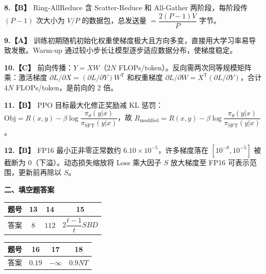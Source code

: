 \documentclass[a4paper]{ctexart}
\newcommand{\bodyfont}{\fontsize{12pt}{16pt}\selectfont}
\begin{document}
\noindent\textbf{8.【B】} Ring-AllReduce 含 Scatter-Reduce 和 All-Gather 两阶段，每阶段传 $(P-1)$ 次大小为 $V/P$ 的数据包，总发送量 $=\dfrac{2(P-1)V}{P}$ 字节。

\vspace{0.5em}

\noindent\textbf{9.【A】} 训练初期随机初始化权重使梯度极大且方向多变，直接用大学习率易导致发散。Warm-up 通过较小步长让模型逐步适应数据分布，使梯度稳定。

\vspace{0.5em}

\noindent\textbf{10.【C】} 前向传播：$Y=XW$（$2N$ FLOPs/token）。反向需两次同等规模矩阵乘：激活梯度 $\partial L/\partial X=(\partial L/\partial Y)W^{\mathsf{T}}$ 和权重梯度 $\partial L/\partial W=X^{\mathsf{T}}(\partial L/\partial Y)$，合计 $4N$ FLOPs/token，是前向的 2 倍。

\vspace{0.5em}

\noindent\textbf{11.【B】} PPO 目标最大化修正奖励减 KL 惩罚：$\mathrm{Obj}=R(x,y)-\beta\log\dfrac{\pi_\theta(y|x)}{\pi_{\mathrm{SFT}}(y|x)}$，故 $R_{\mathrm{modified}}=R(x,y)-\beta\log\dfrac{\pi_\theta(y|x)}{\pi_{\mathrm{SFT}}(y|x)}$。

\vspace{0.5em}

\noindent\textbf{12.【B】} FP16 最小正非零正常数约 $6.10\times10^{-5}$，许多梯度落在 $[10^{-8},10^{-5}]$ 被截断为 0（下溢）。动态损失缩放将 Loss 乘大因子 $S$ 放大梯度至 FP16 可表示范围，更新前再除以 $S$。

\vspace{0.9em}

{\bodyfont\heiti\bfseries 二、填空题答案}

\vspace{0.4em}
\begin{center}
\begin{tabular}{c|ccc}
\toprule
题号 & 13 & 14 & 15 \\
\midrule
答案 & $8$ & $112$ & $2\dfrac{t-1}{t}SBD$ \\
\bottomrule
\end{tabular}
\qquad
\begin{tabular}{c|ccc}
\toprule
题号 & 16 & 17 & 18 \\
\midrule
答案 & $0.19$ & $-\infty$ & $0.9NT$ \\
\bottomrule
\end{tabular}
\end{center}
\end{document}
